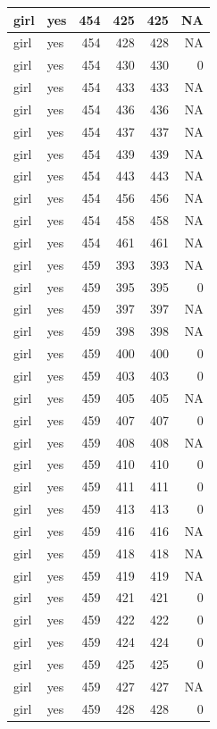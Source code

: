 \documentclass[man]{apa6}
\begin{document}
\begin{tabular}{l|l|r|r|r|r}
\hline
girl & yes & 454 & 425 & 425 & NA\\
\hline
girl & yes & 454 & 428 & 428 & NA\\
\hline
girl & yes & 454 & 430 & 430 & 0\\
\hline
girl & yes & 454 & 433 & 433 & NA\\
\hline
girl & yes & 454 & 436 & 436 & NA\\
\hline
girl & yes & 454 & 437 & 437 & NA\\
\hline
girl & yes & 454 & 439 & 439 & NA\\
\hline
girl & yes & 454 & 443 & 443 & NA\\
\hline
girl & yes & 454 & 456 & 456 & NA\\
\hline
girl & yes & 454 & 458 & 458 & NA\\
\hline
girl & yes & 454 & 461 & 461 & NA\\
\hline
girl & yes & 459 & 393 & 393 & NA\\
\hline
girl & yes & 459 & 395 & 395 & 0\\
\hline
girl & yes & 459 & 397 & 397 & NA\\
\hline
girl & yes & 459 & 398 & 398 & NA\\
\hline
girl & yes & 459 & 400 & 400 & 0\\
\hline
girl & yes & 459 & 403 & 403 & 0\\
\hline
girl & yes & 459 & 405 & 405 & NA\\
\hline
girl & yes & 459 & 407 & 407 & 0\\
\hline
girl & yes & 459 & 408 & 408 & NA\\
\hline
girl & yes & 459 & 410 & 410 & 0\\
\hline
girl & yes & 459 & 411 & 411 & 0\\
\hline
girl & yes & 459 & 413 & 413 & 0\\
\hline
girl & yes & 459 & 416 & 416 & NA\\
\hline
girl & yes & 459 & 418 & 418 & NA\\
\hline
girl & yes & 459 & 419 & 419 & NA\\
\hline
girl & yes & 459 & 421 & 421 & 0\\
\hline
girl & yes & 459 & 422 & 422 & 0\\
\hline
girl & yes & 459 & 424 & 424 & 0\\
\hline
girl & yes & 459 & 425 & 425 & 0\\
\hline
girl & yes & 459 & 427 & 427 & NA\\
\hline
girl & yes & 459 & 428 & 428 & 0\\

\end{tabular}
\end{document}
